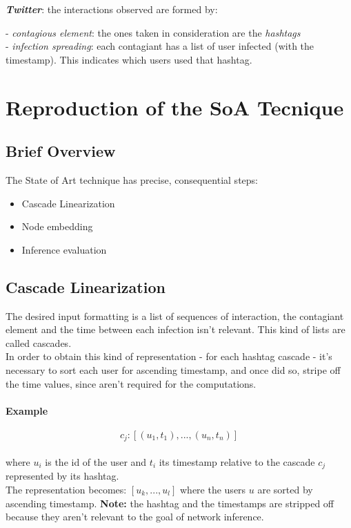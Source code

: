 \documentclass{article}
\begin{document}
		\begin{addmargin}[2em]{0em}
			\textbf{\textit{Twitter}}: the interactions observed are formed by:\\
				\begin{addmargin}[2em]{0em}
					- \textit{contagious element}: the ones taken in consideration are the \textit{hashtags} \\
					- \textit{infection spreading}: each contagiant has a list of user infected (with the timestamp). This indicates which users used that hashtag.
				\end{addmargin}
		\end{addmargin}
	
	\section{Reproduction of the SoA Tecnique}
		\subsection{Brief Overview}
			The State of Art technique has precise, consequential steps:
			\begin{itemize}
				\item Cascade Linearization
				\item Node embedding
				\item Inference evaluation
			\end{itemize}
		\subsection{Cascade Linearization}
			The desired input formatting is a list of sequences of interaction, the contagiant element and the time between each infection isn't relevant. This kind of lists are called cascades.\\
			In order to obtain this kind of representation - for each hashtag cascade - it's necessary to sort each user for ascending timestamp, and once did so, stripe off the time values, since aren't required for the computations.\\
			\paragraph{Example}
				\begin{addmargin}[1em]{0em}
					$$c_{j}: [(u_{1},t_{1}), ..., (u_{n},t_{n})]$$
					\\
					where $u_{i}$ is the id of the user and $t_{i}$ its timestamp relative to the cascade $c_{j}$ represented by its hashtag.\\
					The representation becomes: $[u_{k},...,u_{l}]$ where the users $u$ are sorted by ascending timestamp. \textbf{Note:} the hashtag and the timestamps are stripped off because they aren't relevant to the goal of network inference.
				\end{addmargin}
\end{document}
